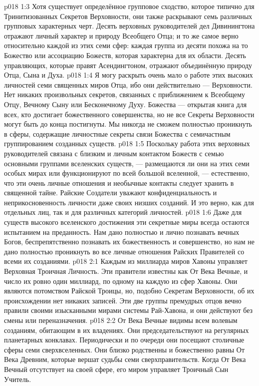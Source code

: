 \vs p018 1:3 Хотя существует определённое групповое сходство, которое типично для Тринитизованных Секретов Верховности, они также раскрывают семь различных групповых характерных черт. Десять верховных руководителей дел Дивинингтона отражают личный характер и природу Всеобщего Отца; и то же самое верно относительно каждой из этих семи сфер: каждая группа из десяти похожа на то Божество или ассоциацию Божеств, которая характерна для их области. Десять управляющих, которые правят Асендингтоном, отражают объединённую природу Отца, Сына и Духа.
\vs p018 1:4 \pc Я могу раскрыть очень мало о работе этих высоких личностей семи священных миров Отца, ибо они действительно ---  Верховности. Нет никаких произвольных секретов, связанных с приближением к Всеобщему Отцу, Вечному Сыну или Бесконечному Духу. Божества --- открытая книга для всех, кто достигает божественного совершенства, но не все Секреты Верховности могут быть до конца постигнуты. Мы никогда не сможем полностью проникнуть в сферы, содержащие личностные секреты связи Божества с семичастным группированием созданных существ.
\vs p018 1:5 Поскольку работа этих верховных руководителей связана с близким и личным контактом Божеств с семью основными группами вселенских существ, --- размещаются ли они на этих семи особых мирах или функционируют по всей большой вселенной, --- естественно, что эти очень личные отношения и необычные контакты следует хранить в священной тайне. Райские Создатели уважают конфиденциальность и неприкосновенность личности даже своих низших созданий. И это верно, как для отдельных лиц, так и для различных категорий личностей.
\vs p018 1:6 Даже для существ высокого вселенского достижения эти секретные миры всегда остаются испытанием на преданность. Нам дано полностью и лично познавать вечных Богов, беспрепятственно познавать их божественность и совершенство, но нам не дано полностью проникнуть во все личные отношения Райских Правителей со всеми их созданиями.
\vs p018 2:1 Каждым из миллиарда миров Хавоны управляет Верховная Троичная Личность. Эти правители известны как От Века Вечные, и число их ровно один миллиард, по одному на каждую из сфер Хавоны. Они являются потомством Райской Троицы, но, подобно Секретам Верховности, об их происхождении нет никаких записей. Эти две группы премудрых отцов вечно правили своими изысканными мирами системы Рай\hyp{}Хавона, и они действуют без смены или переназначения.
\vs p018 2:2 От Века Вечные видимы всем волевым созданиям, обитающим в их владениях. Они председательствуют на регулярных планетарных конклавах. Периодически и по очереди они посещают столичные сферы семи сверхвселенных. Они близко родственны и божественно равны От Века Древним, которые вершат судьбы семи сверхправительств. Когда От Века Вечный отсутствует на своей сфере, его миром управляет Троичный Сын Учитель.
